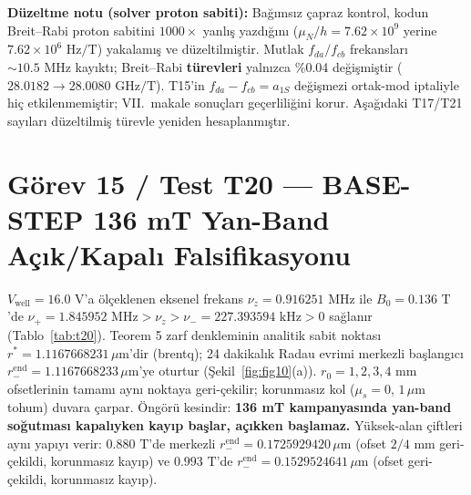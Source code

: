 \documentclass[12pt,a4paper]{article}
\begin{document}
\textbf{Düzeltme notu (solver proton sabiti):} Bağımsız çapraz kontrol, kodun Breit--Rabi proton sabitini $1000\times$ yanlış yazdığını ($\mu_{N}/h = 7.62\times 10^9$ yerine $7.62\times 10^6\text{ Hz/T}$) yakalamış ve düzeltilmiştir. Mutlak $f_{da}/f_{cb}$ frekansları $\sim 10.5\text{ MHz}$ kayıktı; Breit--Rabi \textbf{türevleri} yalnızca \%0.04 değişmiştir ($28.0182\to 28.0080\text{ GHz/T}$). T15'in $f_{da}-f_{cb}=a_{1S}$ değişmezi ortak-mod iptaliyle hiç etkilenmemiştir; VII.\ makale sonuçları geçerliliğini korur. Aşağıdaki T17/T21 sayıları düzeltilmiş türevle yeniden hesaplanmıştır.

\section{Görev 15 / Test T20 --- BASE-STEP 136 mT Yan-Band Açık/Kapalı Falsifikasyonu}

$V_{\mathrm{well}}=16.0\text{ V}$'a ölçeklenen eksenel frekans $\nu_z=0.916251\text{ MHz}$ ile $B_0=0.136\text{ T}$'de $\nu_+=1.845952\text{ MHz}>\nu_z>\nu_-=227.393594\text{ kHz}>0$ sağlanır (Tablo~\ref{tab:t20}). Teorem 5 zarf denkleminin analitik sabit noktası $r^*=1.1167668231\,\mu\text{m}$'dir (brentq); 24 dakikalık Radau evrimi merkezli başlangıcı $r_-^{\mathrm{end}}=1.1167668233\,\mu\text{m}$'ye oturtur (Şekil~\ref{fig:fig10}(a)). $r_0=1,2,3,4\text{ mm}$ ofsetlerinin tamamı aynı noktaya geri-çekilir; korunmasız kol ($\mu_s=0$, $1\,\mu\text{m}$ tohum) duvara çarpar. Öngörü kesindir: \textbf{136 mT kampanyasında yan-band soğutması kapalıyken kayıp başlar, açıkken başlamaz.} Yüksek-alan çiftleri aynı yapıyı verir: $0.880\text{ T}$'de merkezli $r_-^{\mathrm{end}}=0.1725929420\,\mu\text{m}$ (ofset $2/4\text{ mm}$ geri-çekildi, korunmasız kayıp) ve $0.993\text{ T}$'de $r_-^{\mathrm{end}}=0.1529524641\,\mu\text{m}$ (ofset geri-çekildi, korunmasız kayıp).
\end{document}
